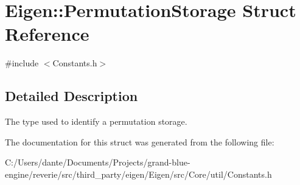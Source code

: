 \hypertarget{struct_eigen_1_1_permutation_storage}{}\section{Eigen\+::Permutation\+Storage Struct Reference}
\label{struct_eigen_1_1_permutation_storage}


{\ttfamily \#include $<$Constants.\+h$>$}



\subsection{Detailed Description}
The type used to identify a permutation storage. 

The documentation for this struct was generated from the following file\+:\begin{DoxyCompactItemize}
\item 
C\+:/\+Users/dante/\+Documents/\+Projects/grand-\/blue-\/engine/reverie/src/third\+\_\+party/eigen/\+Eigen/src/\+Core/util/Constants.\+h\end{DoxyCompactItemize}
